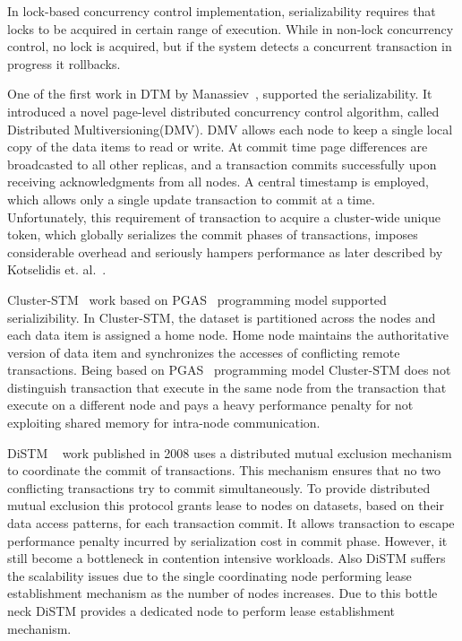 \documentclass[12pt,english]{report}
\begin{document}
In lock-based concurrency control implementation, serializability requires that locks to be acquired in certain range of execution. While in non-lock concurrency control, no lock is acquired, but if the system detects a concurrent transaction in progress it rollbacks.

One of the first work in DTM by Manassiev~\cite{Manassiev:2006:EDV:1122971.1123002}, supported the serializability. It introduced a novel page-level distributed concurrency control algorithm, called Distributed Multiversioning(DMV). DMV allows each node to keep a single local copy of the data items to read or write. At commit time page differences are broadcasted to all other replicas, and a transaction commits successfully upon receiving acknowledgments from all nodes. A central timestamp is employed, which allows only a single update transaction to commit at a time. Unfortunately, this requirement of transaction to acquire a cluster-wide unique token, which globally serializes the commit phases of transactions, imposes considerable overhead and seriously hampers performance as later described by Kotselidis et. al.~\cite{Kotselidis08distm:a}.

Cluster-STM~\cite{Bocchino:2008:STM:1345206.1345242} work based on PGAS~\cite{PGAS:Programmin:Model} programming model supported serializibility. In Cluster-STM, the dataset is partitioned across the nodes and each data item is assigned a home node. Home node maintains the authoritative version of data item and synchronizes the accesses of conflicting remote transactions. Being based on PGAS~\cite{PGAS:Programmin:Model} programming model Cluster-STM does not distinguish transaction that execute in the same node from the transaction that execute on a different node and pays a heavy performance penalty for not exploiting shared memory for intra-node communication.

DiSTM ~\cite{Kotselidis08distm:a} work published in 2008 uses a distributed mutual exclusion mechanism to coordinate the commit of transactions. This mechanism ensures that no two conflicting transactions try to commit simultaneously. To provide distributed mutual exclusion this protocol grants lease to nodes on datasets, based on their data access patterns, for each transaction commit. It allows transaction to escape performance penalty incurred by serialization cost in commit phase. However, it still become a bottleneck in contention intensive workloads. Also DiSTM suffers the scalability issues due to the single coordinating node performing lease establishment mechanism as the number of nodes increases. Due to this bottle neck DiSTM provides a dedicated node to perform lease establishment mechanism.
\end{document}
